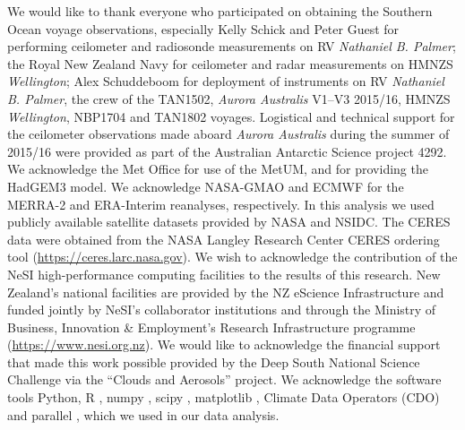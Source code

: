 We would like to thank everyone who participated on obtaining the Southern
Ocean voyage observations, especially Kelly Schick and Peter Guest for
performing ceilometer and radiosonde measurements on RV \textit{Nathaniel B.
Palmer}; the Royal New Zealand Navy for ceilometer and radar measurements on
HMNZS \textit{Wellington}; Alex Schuddeboom for deployment of instruments on RV
\textit{Nathaniel B. Palmer}, the crew of the TAN1502, \textit{Aurora
Australis} V1--V3 2015/16, HMNZS \textit{Wellington}, NBP1704 and TAN1802
voyages.  Logistical and technical support for the ceilometer observations made
aboard \textit{Aurora Australis} during the summer of 2015/16 were provided as
part of the Australian Antarctic Science project 4292. We acknowledge the Met
Office for use of the MetUM, and for providing the HadGEM3 model. We
acknowledge NASA-GMAO and ECMWF for the MERRA-2 and ERA-Interim reanalyses,
respectively. In this analysis we used publicly available satellite datasets
provided by NASA and NSIDC. The CERES data were obtained from the NASA Langley
Research Center CERES ordering tool (\url{https://ceres.larc.nasa.gov}). We
wish to acknowledge the contribution of the NeSI high-performance computing
facilities to the results of this research. New Zealand's national facilities
are provided by the NZ eScience Infrastructure and funded jointly by NeSI's
collaborator institutions and through the Ministry of Business, Innovation \&
Employment's Research Infrastructure programme (\url{https://www.nesi.org.nz}).
We would like to acknowledge the financial support that made this work possible
provided by the Deep South National Science Challenge via the ``Clouds and
Aerosols'' project.  We acknowledge the software tools Python, R \citep{r},
numpy \citep{oliphant2006}, scipy \citep{scipy}, matplotlib \citep{hunter2007},
Climate Data Operators (CDO) \citep{schulzweida2018} and parallel
\citep{tange2011}, which we used in our data analysis.

